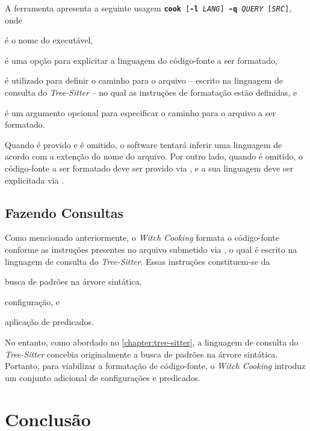 \documentclass
  [11pt, a4paper, english, openright, sumario = tradicional, twoside, brazil]
  {abntex2}
\newcommand{\treesitter}{\textit{Tree-Sitter}\xspace}
\newcommand{\witchcooking}{\textit{Witch Cooking}\xspace}
\begin{document}
  A ferramenta apresenta a seguinte usagem
  \boxed
    {\texttt{\textbf{cook}
     [\textbf{-l} \textit{LANG}]
     \textbf{-q} \textit{QUERY}
     [\textit{SRC}]}},
  onde
  \begin{inparaenum}
    \item {} é o nome do executável,
    \item {} é uma opção para
          explicitar a linguagem do código-fonte a ser formatado,
    \item {} é utilizado para
          definir o caminho para o arquivo -- escrito na linguagem de consulta
          do \treesitter{} -- no qual as instruções de formatação estão
          definidas, e
    \item {} é um argumento opcional para
          especificar o caminho para o arquivo a ser formatado.
  \end{inparaenum}
  Quando  é provido e
   é omitido, o software tentará
  inferir uma linguagem de acordo com a extenção do nome do arquivo. Por outro
  lado, quando  é omitido, o código-fonte a ser
  formatado deve ser provido via \textit{}, e a sua linguagem
  deve ser explicitada via .

  \section{Fazendo Consultas}

  Como mencionado anteriormente, o \witchcooking formata o código-fonte
  conforme as instruções presentes no arquivo submetido via
  , o qual é escrito na linguagem de
  consulta do \treesitter. Essas instruções constituem-se da
  \begin{inparaenum}
    \item busca de padrões na árvore sintática,
    \item configuração, e
    \item aplicação de predicados.
  \end{inparaenum}
  No entanto, como abordado no \autoref{chapter:tree-sitter}, a linguagem de
  consulta do \treesitter concebia originalmente a busca de padrões na árvore
  sintática. Portanto, para viabilizar a formatação de código-fonte, o
  \witchcooking introduz um conjunto adicional de configurações e
  predicados.


  \chapter{Conclusão}


  \postextual
  \printbibliography
\end{document}
